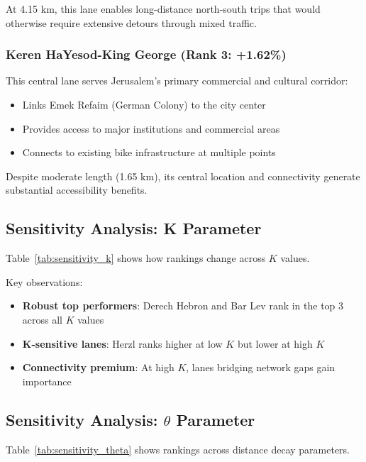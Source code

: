 \documentclass[12pt,a4paper]{article}
\begin{document}
At 4.15 km, this lane enables long-distance north-south trips that would otherwise require extensive detours through mixed traffic.

\subsubsection{Keren HaYesod-King George (Rank 3: +1.62\%)}

This central lane serves Jerusalem's primary commercial and cultural corridor:
\begin{itemize}
    \item Links Emek Refaim (German Colony) to the city center
    \item Provides access to major institutions and commercial areas
    \item Connects to existing bike infrastructure at multiple points
\end{itemize}

Despite moderate length (1.65 km), its central location and connectivity generate substantial accessibility benefits.

\subsection{Sensitivity Analysis: K Parameter}

Table~\ref{tab:sensitivity_k} shows how rankings change across $K$ values.



Key observations:
\begin{itemize}
    \item \textbf{Robust top performers}: Derech Hebron and Bar Lev rank in the top 3 across all $K$ values
    \item \textbf{K-sensitive lanes}: Herzl ranks higher at low $K$ but lower at high $K$
    \item \textbf{Connectivity premium}: At high $K$, lanes bridging network gaps gain importance
\end{itemize}

\subsection{Sensitivity Analysis: $\theta$ Parameter}

Table~\ref{tab:sensitivity_theta} shows rankings across distance decay parameters.


\end{document}
